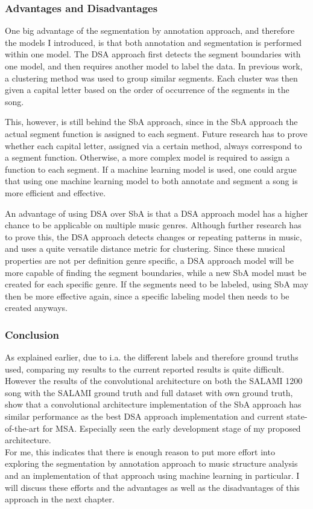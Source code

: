 \subsubsection{Advantages and Disadvantages}
One big advantage of the segmentation by annotation approach, and therefore the models I introduced, is that both annotation and segmentation is performed within one model. The DSA approach first detects the segment boundaries with one model, and then requires another model to label the data. In previous work, a clustering method was used to group similar segments. Each cluster was then given a capital letter based on the order of occurrence of the segments in the song.

This, however, is still behind the SbA approach, since in the SbA approach the actual segment function is assigned to each segment. Future research has to prove whether each capital letter, assigned via a certain method, always correspond to a segment function. Otherwise, a more complex model is required to assign a function to each segment. If a machine learning model is used, one could argue that using one machine learning model to both annotate and segment a song is more efficient and effective.

An advantage of using DSA over SbA is that a DSA approach model has a higher chance to be applicable on multiple music genres. Although further research has to prove this, the DSA approach detects changes or repeating patterns in music, and uses a quite versatile distance metric for clustering. Since these musical properties are not per definition genre specific, a DSA approach model will be more capable of finding the segment boundaries, while a new SbA model must be created for each specific genre. If the segments need to be labeled, using SbA may then be more effective again, since a specific labeling model then needs to be created anyways.

\subsubsection{Conclusion}
As explained earlier, due to i.a. the different labels and therefore ground truths used, comparing my results to the current reported results is quite difficult. However the results of the convolutional architecture on both the SALAMI 1200 song with the SALAMI ground truth and full dataset with own ground truth, show that a convolutional architecture implementation of the SbA approach has similar performance as the best DSA approach implementation and current state-of-the-art for MSA. Especially seen the early development stage of my proposed architecture.\\

For me, this indicates that there is enough reason to put more effort into exploring the segmentation by annotation approach to music structure analysis and an implementation of that approach using machine learning in particular. I will discuss these efforts and the advantages as well as the disadvantages of this approach in the next chapter.